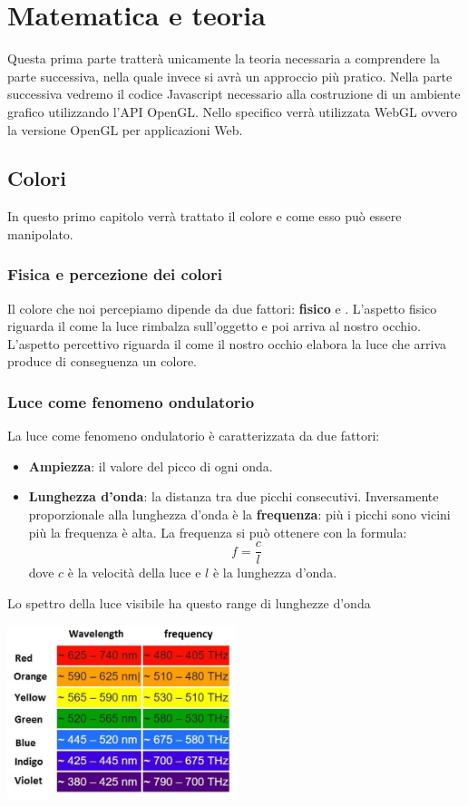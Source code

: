 \part{Matematica e teoria}\label{matematica}
Questa prima parte tratter\`a unicamente la teoria necessaria a comprendere la parte successiva, nella quale invece
si avr\`a un approccio pi\`u pratico. Nella parte successiva vedremo il codice Javascript necessario alla costruzione
di un ambiente grafico utilizzando l'API OpenGL. Nello specifico verr\`a utilizzata WebGL ovvero la versione OpenGL
per applicazioni Web.

\chapter{Colori}\label{colori}
In questo primo capitolo verr\`a trattato il colore e come esso pu\`o essere manipolato.

\section{Fisica e percezione dei colori}
Il colore che noi percepiamo dipende da due fattori: \textbf{fisico} e \textbf{}.
L'aspetto fisico riguarda il come la luce rimbalza sull'oggetto e poi arriva al
nostro occhio. L'aspetto percettivo riguarda il come il nostro occhio elabora la
luce che arriva produce di conseguenza un colore.

\section{Luce come fenomeno ondulatorio}
La luce come fenomeno ondulatorio \`e caratterizzata da due fattori:
\begin{itemize}
	\item \textbf{Ampiezza}: il valore del picco di ogni onda.
	\item \textbf{Lunghezza d'onda}: la distanza tra due picchi consecutivi. Inversamente
	      proporzionale alla lunghezza d'onda \`e la \textbf{frequenza}: pi\`u i picchi sono
	      vicini pi\`u la frequenza \`e alta. La frequenza si pu\`o ottenere con la formula:
	      \[ f = \frac{c}{l} \]
	      dove $c$ \`e la velocit\`a della luce e $l$ \`e la lunghezza d'onda.
\end{itemize}
Lo spettro della luce visibile ha questo range di lunghezze d'onda

\begin{center}
	\includegraphics[width=0.5\textwidth]{immagini/spettro_visibile}
\end{center}

